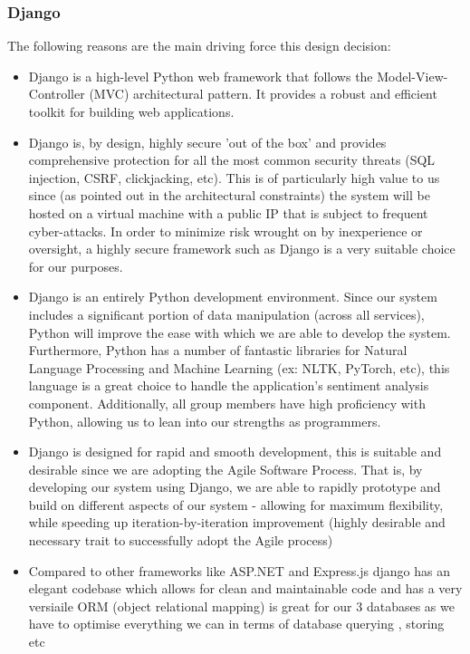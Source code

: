 \documentclass[12pt]{article}
\begin{document}
\subsubsection{Django}
The following reasons are the main driving force this design decision:
\begin{itemize}
    \item Django is a high-level Python web framework that follows the Model-View-Controller (MVC) architectural pattern. It provides a robust and efficient toolkit for building web applications.
\end{itemize}
\begin{itemize}
    \item Django is, by design, highly secure 'out of the box' and provides comprehensive protection for all the most common security threats (SQL injection, CSRF, clickjacking, etc). This is of particularly high value to us since (as pointed out in the architectural constraints) the system will be hosted on a virtual machine with a public IP that is subject to frequent cyber-attacks. In order to minimize risk wrought on by inexperience or oversight, a highly secure framework such as Django is a very suitable choice for our purposes.
    \item Django is an entirely Python development environment. Since our system includes a significant portion of data manipulation (across all services), Python will improve the ease with which we are able to develop the system. Furthermore, Python has a number of fantastic libraries for Natural Language Processing and Machine Learning (ex: NLTK, PyTorch, etc), this language is a great choice to handle the application's sentiment analysis component. Additionally, all group members have high proficiency with Python, allowing us to lean into our strengths as programmers.
    \item Django is designed for rapid and smooth development, this is suitable and desirable since we are adopting the Agile Software Process. That is, by developing our system using Django, we are able to rapidly prototype and build on different aspects of our system - allowing for maximum flexibility, while speeding up iteration-by-iteration improvement (highly desirable and necessary trait to successfully adopt the Agile process)
    \item Compared to other frameworks like ASP.NET and Express.js django has an elegant codebase which allows for clean and maintainable code and has a very versiaile ORM (object relational mapping) is great for our 3 databases as we have to optimise everything we can in terms of database querying , storing etc
\end{itemize}
\end{document}
